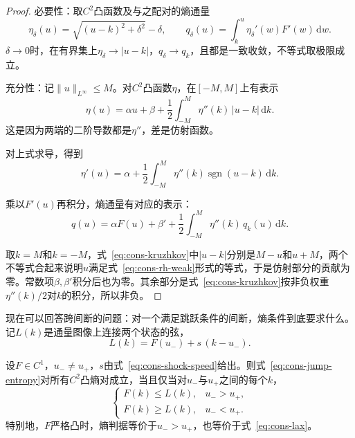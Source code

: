 \begin{proof}
必要性：取$C^2$凸函数及与之配对的熵通量
\[
  \eta_\delta(u)=\sqrt{(u-k)^2+\delta^2}-\delta,\qquad
  q_\delta(u)=\int_k^u\eta_\delta'(w)F'(w)\,\mathrm{d}w .
\]
$\delta\to0$时，在有界集上$\eta_\delta\to\lvert u-k\rvert$，$q_\delta\to q_k$，且都是一致收敛，不等式取极限成立。

充分性：记$\lVert u\rVert_{L^\infty}\leq M$。对$C^2$凸函数$\eta$，在$[-M,M]$上有表示
\[
  \eta(u)=\alpha u+\beta+\frac12\int_{-M}^{M}\eta''(k)\,\lvert u-k\rvert\,\mathrm{d}k .
\]
这是因为两端的二阶导数都是$\eta''$，差是仿射函数。

对上式求导，得到
\[
  \eta'(u)=\alpha+\frac12\int_{-M}^{M}\eta''(k)\operatorname{sgn}(u-k)\,\mathrm{d}k .
\]

乘以$F'(u)$再积分，熵通量有对应的表示：
\[
  q(u)=\alpha F(u)+\beta'+\frac12\int_{-M}^{M}\eta''(k)\,q_k(u)\,\mathrm{d}k .
\]

取$k=M$和$k=-M$，式~\eqref{eq:cons-kruzhkov}中$\lvert u-k\rvert$分别是$M-u$和$u+M$，两个不等式合起来说明$u$满足式~\eqref{eq:cons-rh-weak}形式的等式，于是仿射部分的贡献为零。常数项$\beta,\beta'$积分后也为零。其余部分是式~\eqref{eq:cons-kruzhkov}按非负权重$\eta''(k)/2$对$k$的积分，所以非负。
\end{proof}

现在可以回答跨间断的问题：对一个满足跳跃条件的间断，熵条件到底要求什么。记$L(k)$是通量图像上连接两个状态的弦，
\begin{equation}
  L(k)=F(u_-)+s\,(k-u_-).
  \label{eq:cons-chord}
\end{equation}

\begin{theorem}[跨间断的熵判据]
\label{thm:cons-chord}
设$F\in C^1$，$u_-\neq u_+$，$s$由式~\eqref{eq:cons-shock-speed}给出。则式~\eqref{eq:cons-jump-entropy}对所有$C^2$凸熵对成立，当且仅当对$u_-$与$u_+$之间的每个$k$，
\begin{equation}
  \begin{cases}
    F(k)\leq L(k),&u_->u_+,\\
    F(k)\geq L(k),&u_-<u_+.
  \end{cases}
  \label{eq:cons-oleinik}
\end{equation}
特别地，$F$严格凸时，熵判据等价于$u_->u_+$，也等价于式~\eqref{eq:cons-lax}。
\end{theorem}

